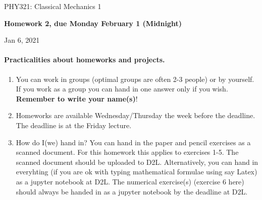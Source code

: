 \documentclass[%
oneside,                 %
final,                   %
10pt]{article}
\begin{document}

\newcommand{\exercisesection}[1]{\subsection*{#1}}






\thispagestyle{empty}

\begin{center}
{\LARGE\bf
\begin{spacing}{1.25}
PHY321: Classical Mechanics 1
\end{spacing}
}
\end{center}


\begin{center}
{\bf Homework 2, due Monday February 1 (Midnight)${}^{}$} \\ [0mm]
\end{center}

\begin{center}
\end{center}
    

\begin{center}
Jan 6, 2021
\end{center}

\vspace{1cm}


\paragraph{Practicalities about  homeworks and projects.}
\begin{enumerate}
\item You can work in groups (optimal groups are often 2-3 people) or by yourself. If you work as a group you can hand in one answer only if you wish. \textbf{Remember to write your name(s)}!

\item Homeworks are available Wednesday/Thursday the week before the deadline. The deadline is at the Friday lecture.

\item How do I(we)  hand in?  You can hand in the paper and pencil exercises as a  scanned  document. For this homework this applies to exercises 1-5. The scanned document should be uploaded to D2L. Alternatively, you can hand in everyhting (if you are ok with typing mathematical formulae using say Latex) as a jupyter notebook at D2L. The numerical exercise(s) (exercise 6 here) should always be handed in as a jupyter notebook by the deadline at D2L. 
\end{enumerate}
\end{document}
